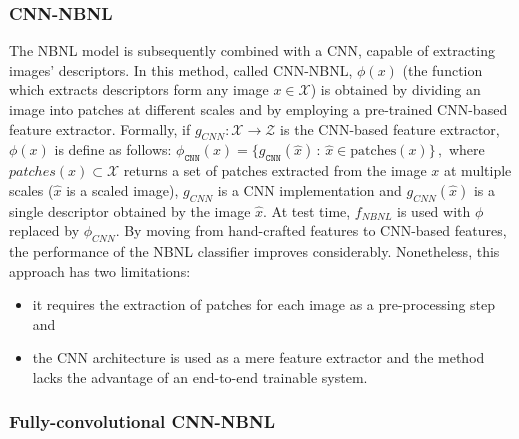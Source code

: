 \subsubsection{CNN-NBNL}\label{header-n681}

The NBNL model is subsequently combined with a CNN, capable of
extracting images' descriptors. In this method, called CNN-NBNL,
$\phi(x)$ (the function which extracts descriptors form any image
$x \in {\mathcal X}$) is obtained by dividing an image into patches at
different scales and by employing a pre-trained CNN-based feature
extractor. Formally, if
$g_{CNN} : {\mathcal X} \rightarrow {\mathcal Z}$ is the CNN-based
feature extractor, $\phi(x)$ is define as follows:
\newline
$ \phi _\mathtt {CNN}(x)=\lbrace g_\mathtt {CNN}(\hat{x})\,:\,\hat{x}\in \text{patches}(x)\rbrace \,, $
\newline
where $patches(x) \subset {\mathcal X}$ returns a set of patches
extracted from the image $x$ at multiple scales (${\hat x}$ is a
scaled image), $g_{CNN}$ is a CNN implementation and
$g_{CNN}({\hat x})$ is a single descriptor obtained by the image
${\hat x}$. At test time, $f_{NBNL}$ is used with $\phi$ replaced
by $\phi_{CNN}$. By moving from hand-crafted features to CNN-based
features, the performance of the NBNL classifier improves considerably.
Nonetheless, this approach has two limitations:

\begin{itemize}
\item
  it requires the extraction of patches for each image as a
  pre-processing step and
\item
  the CNN architecture is used as a mere feature extractor and the
  method lacks the advantage of an end-to-end trainable system.
\end{itemize}

\subsubsection{Fully-convolutional CNN-NBNL}\label{header-n690}

